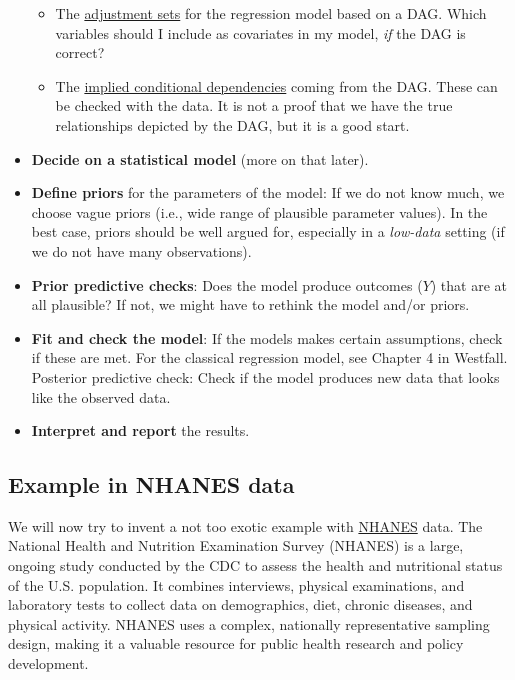 \documentclass[
]{book}
\providecommand{\tightlist}{%
  \setlength{\itemsep}{0pt}\setlength{\parskip}{0pt}}
\begin{document}
\begin{itemize}
  \begin{itemize}
  \tightlist
  \item
    The \href{https://rdrr.io/cran/dagitty/man/adjustmentSets.html}{adjustment sets}
    for the regression model based on a DAG. Which variables should I include
    as covariates in my model, \emph{if} the DAG is correct?
  \item
    The \href{https://search.r-project.org/CRAN/refmans/dagitty/html/impliedConditionalIndependencies.html}{implied conditional dependencies}
    coming from the DAG. These
    can be checked with the data. It is not a proof that we have the true
    relationships depicted by the DAG, but it is a good start.
  \end{itemize}
\item
  \textbf{Decide on a statistical model} (more on that later).
\item
  \textbf{Define priors} for the parameters of the model:
  If we do not know much, we choose vague priors (i.e., wide range of plausible
  parameter values). In the best case,
  priors should be well argued for, especially in a \emph{low-data} setting
  (if we do not have many observations).
\item
  \textbf{Prior predictive checks}: Does the model produce outcomes (\(Y\)) that
  are at all plausible? If not, we might have to rethink the model and/or priors.
\item
  \textbf{Fit and check the model}:
  If the models makes certain assumptions, check if these are met.
  For the classical regression model, see Chapter 4 in Westfall.
  Posterior predictive check: Check if the model produces new data that looks
  like the observed data.
\item
  \textbf{Interpret and report} the results.
\end{itemize}

\subsection{Example in NHANES data}\label{example_nhanes}

We will now try to invent a not too exotic example with
\href{https://www.cdc.gov/nchs/nhanes/index.html}{NHANES} data.
The National Health and Nutrition Examination Survey (NHANES) is a large,
ongoing study conducted by the CDC to assess the health and nutritional status
of the U.S. population. It combines interviews, physical examinations, and
laboratory tests to collect data on demographics, diet, chronic diseases, and
physical activity. NHANES uses a complex, nationally representative sampling
design, making it a valuable resource for public health research and policy
development.
\end{document}
